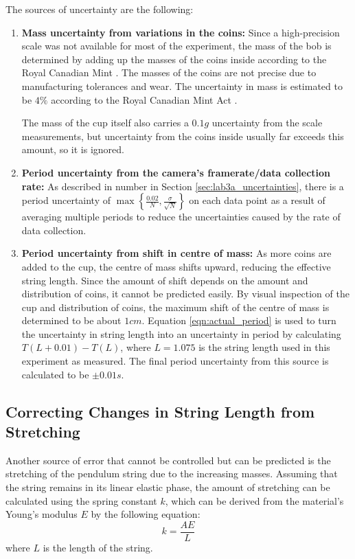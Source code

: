 \documentclass[aps,twocolumn,secnumarabic,nobalancelastpage,amsmath,amssymb,nofootinbib,floatfix,letterpaper]{revtex4}
\begin{document}
The sources of uncertainty are the following:
\begin{enumerate}
    \item
        \textbf{Mass uncertainty from variations in the coins:} Since a high-precision scale was not available for most
        of the experiment, the mass of the bob is determined by adding up the masses of the coins inside according to
        the Royal Canadian Mint \cite{mint}. The masses of the coins are not precise due to manufacturing tolerances and
        wear. The uncertainty in mass is estimated to be \(4\%\) according to the Royal Canadian Mint Act \cite{mint_act}.
        
        The mass of the cup itself also carries a \(0.1\si{g}\) uncertainty from the scale measurements, but uncertainty
        from the coins inside usually far exceeds this amount, so it is ignored.
    \item
        \textbf{Period uncertainty from the camera's framerate/data collection rate:} As described in number 
        in Section \ref{sec:lab3a_uncertainties}, there is a period uncertainty of
        \(\max\left\{\frac{0.02}{N}, \frac{\sigma}{\sqrt{N}}\right\}\) on each data point as a result of averaging
        multiple periods to reduce the uncertainties caused by the rate of data collection.
    \item
        \textbf{Period uncertainty from shift in centre of mass:} As more coins are added to the cup, the centre of mass
        shifts upward, reducing the effective string length. Since the amount of shift depends on the amount and
        distribution of coins, it cannot be predicted easily. By visual inspection of the cup and distribution of coins,
        the maximum shift of the centre of mass is determined to be about \(1\si{cm}\). Equation \ref{eqn:actual_period}
        is used to turn the uncertainty in string length into an uncertainty in period by calculating \(T(L + 0.01) - T(L)\),
        where \(L = 1.075\) is the string length used in this experiment as measured. The final period uncertainty from
        this source is calculated to be \(\pm 0.01\si{s}\).
\end{enumerate}

\subsection{Correcting Changes in String Length from Stretching}
\label{sec:lab3b_correction}

Another source of error that cannot be controlled but can be predicted is the stretching of the pendulum string due to
the increasing masses. Assuming that the string remains in its linear elastic phase, the amount of stretching can be
calculated using the spring constant \(k\), which can be derived from the material's Young's modulus \(E\) by the
following equation: \cite{civ_notes}
\begin{equation}
    k = \frac{AE}{L}
    \label{eqn:youngs_modulus}
\end{equation}
where \(L\) is the length of the string.
\end{document}
